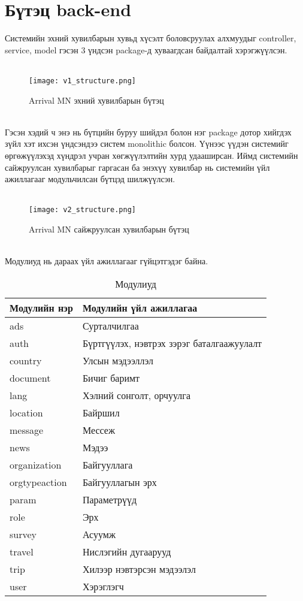 \section{Бүтэц back-end} 
Системийн эхний хувилбарын хувьд хүсэлт боловсруулах алхмуудыг controller, service, model гэсэн 3 үндсэн package-д хуваагдсан байдалтай хэрэгжүүлсэн. 
\\\
\begin{figure}[H]
\texttt{[image: v1\_structure.png]}
\caption{Arrival MN эхний хувилбарын бүтэц}
\end{figure}
\\
Гэсэн хэдий ч энэ нь бүтцийн буруу шийдэл болон нэг package дотор хийгдэх зүйл хэт ихсэн үндсэндээ систем monolithic болсон. Үүнээс үүдэн системийг өргөжүүлэхэд хүндрэл учран хөгжүүлэлтийн хурд удааширсан. Иймд системийн сайжруулсан хувилбарыг гаргасан ба энэхүү хувилбар нь системийн үйл ажиллагааг модульчилсан бүтцэд шилжүүлсэн. 
\\\\
\begin{figure}[H]
\texttt{[image: v2\_structure.png]}
\caption{Arrival MN сайжруулсан хувилбарын бүтэц}
\end{figure}
\\ 

Модулиуд нь дараах үйл ажиллагааг гүйцэтгэдэг байна. 

\begin{table}[h]
\centering
\caption{Модулиуд}
\label{modules}
\begin{tabular}{|l|l|}
\hline
\textbf{Модулийн нэр} & \textbf{Модулийн үйл ажиллагаа}  \\ \hline
        ads           & Сурталчилгаа \\ \hline
        auth          & Бүртгүүлэх, нэвтрэх зэрэг баталгаажуулалт       \\ \hline
        country       & Улсын мэдээллэл \\ \hline
        document      & Бичиг баримт \\ \hline
        lang          & Хэлний сонголт, орчуулга \\ \hline
        location      & Байршил \\ \hline
        message       & Мессеж \\ \hline
        news          & Мэдээ \\ \hline
        organization  & Байгууллага \\ \hline
        orgtypeaction & Байгууллагын эрх \\ \hline
        param         & Параметрүүд \\ \hline
        role          & Эрх \\ \hline
        survey        & Асуумж \\ \hline
        travel        & Нислэгийн дугаарууд \\ \hline
        trip          & Хилээр нэвтэрсэн мэдээлэл \\ \hline
        user          & Хэрэглэгч \\ \hline
\end{tabular}
\end{table}


